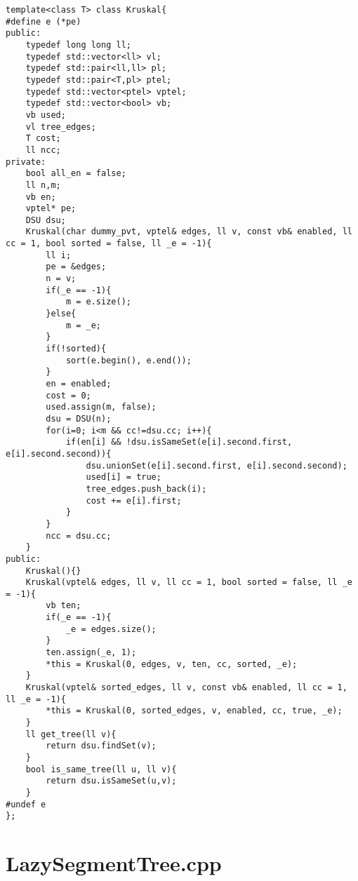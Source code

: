 \documentclass[a4paper,landscape,8pt]{extarticle}
\begin{document}
\begin{multicols}{3}
\begin{lstlisting}
template<class T> class Kruskal{
#define e (*pe)
public:
    typedef long long ll;
    typedef std::vector<ll> vl;
    typedef std::pair<ll,ll> pl;
    typedef std::pair<T,pl> ptel;
    typedef std::vector<ptel> vptel;
    typedef std::vector<bool> vb;
    vb used;
    vl tree_edges;
    T cost;
    ll ncc;
private:
    bool all_en = false;
    ll n,m;
    vb en;
    vptel* pe;
    DSU dsu;
    Kruskal(char dummy_pvt, vptel& edges, ll v, const vb& enabled, ll cc = 1, bool sorted = false, ll _e = -1){
        ll i;
        pe = &edges;
        n = v;
        if(_e == -1){
            m = e.size();
        }else{
            m = _e;
        }
        if(!sorted){
            sort(e.begin(), e.end());
        }
        en = enabled;
        cost = 0;
        used.assign(m, false);
        dsu = DSU(n);
        for(i=0; i<m && cc!=dsu.cc; i++){
            if(en[i] && !dsu.isSameSet(e[i].second.first, e[i].second.second)){
                dsu.unionSet(e[i].second.first, e[i].second.second);
                used[i] = true;
                tree_edges.push_back(i);
                cost += e[i].first;
            }
        }
        ncc = dsu.cc;
    }
public:
    Kruskal(){}
    Kruskal(vptel& edges, ll v, ll cc = 1, bool sorted = false, ll _e = -1){
        vb ten;
        if(_e == -1){
            _e = edges.size();
        }
        ten.assign(_e, 1);
        *this = Kruskal(0, edges, v, ten, cc, sorted, _e);
    }
    Kruskal(vptel& sorted_edges, ll v, const vb& enabled, ll cc = 1, ll _e = -1){
        *this = Kruskal(0, sorted_edges, v, enabled, cc, true, _e);
    }
    ll get_tree(ll v){
        return dsu.findSet(v);
    }
    bool is_same_tree(ll u, ll v){
        return dsu.isSameSet(u,v);
    }
#undef e
};
\end{lstlisting}

\section*{LazySegmentTree.cpp}


\end{multicols}
\end{document}
